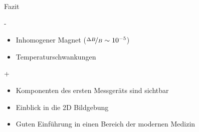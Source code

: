 \begin{frame}{Fazit}
	\begin{alertblock}{-}
	\begin{itemize}
	\item Inhomogener Magnet ($\nicefrac{\Delta B}{B}\sim\num{e-5}$)
	\item Temperaturschwankungen
	\end{itemize}
	\end{alertblock}
	\begin{exampleblock}{+}
	\begin{itemize}
	\item Komponenten des ersten Messgeräts sind sichtbar
	\item Einblick in die 2D Bildgebung 
	\item Guten Einführung in einen Bereich der modernen Medizin
	\end{itemize}
	\end{exampleblock}
\end{frame}